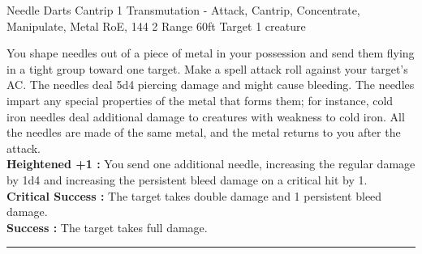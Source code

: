 \documentclass{article}
\begin{document}
\begin{spell}
{Needle Darts} %
{Cantrip 1} %
{Transmutation - Attack, Cantrip, Concentrate, Manipulate, Metal} %
{RoE, 144} %
{2} %
{} %
{Range} {60ft}
{} {}
{Target} {1 creature}
{} {}
    \begingroup
        \singlespacing
        \begin{singlespace*}
        \par\fontsize{8}{10pt}\selectfont
        \vspace{7mm}   %
        You shape needles out of a piece of metal in your possession and send them flying in a tight group toward one target. Make a spell attack roll against your target's AC. The needles deal 5d4 piercing damage and might cause bleeding. The needles impart any special properties of the metal that forms them; for instance, cold iron needles deal additional damage to creatures with weakness to cold iron. All the needles are made of the same metal, and the metal returns to you after the attack.\\
        
         \vspace{2mm}
         \textbf{Heightened +1 :} You send one additional needle, increasing the regular damage by 1d4 and increasing the persistent bleed damage on a critical hit by 1.\\


         \vspace{2mm}
         \textbf{Critical Success :} The target takes double damage and 1 persistent bleed damage.\\
         \textbf{Success :} The target takes full damage.\\
        \rule{\textwidth}{0.5pt}
        \end{singlespace*}
    \endgroup
\end{spell}
\end{document}
